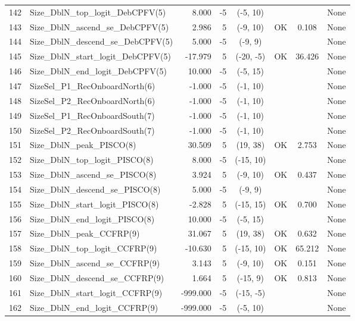 \documentclass[12pt,]{article}
\begin{document}
\begin{landscape}
\begin{longtable}{rlrrcccp{1.5in}}
  142 & Size\_DblN\_top\_logit\_DebCPFV(5) & 8.000 & -5 & (-5, 10) &  &  & None \\ 
  143 & Size\_DblN\_ascend\_se\_DebCPFV(5) & 2.986 & 5 & (-9, 10) & OK & 0.108 & None \\ 
  144 & Size\_DblN\_descend\_se\_DebCPFV(5) & 5.000 & -5 & (-9, 9) &  &  & None \\ 
  145 & Size\_DblN\_start\_logit\_DebCPFV(5) & -17.979 & 5 & (-20, -5) & OK & 36.426 & None \\ 
  146 & Size\_DblN\_end\_logit\_DebCPFV(5) & 10.000 & -5 & (-5, 15) &  &  & None \\ 
  147 & SizeSel\_P1\_RecOnboardNorth(6) & -1.000 & -5 & (-1, 10) &  &  & None \\ 
  148 & SizeSel\_P2\_RecOnboardNorth(6) & -1.000 & -5 & (-1, 10) &  &  & None \\ 
  149 & SizeSel\_P1\_RecOnboardSouth(7) & -1.000 & -5 & (-1, 10) &  &  & None \\ 
  150 & SizeSel\_P2\_RecOnboardSouth(7) & -1.000 & -5 & (-1, 10) &  &  & None \\ 
  151 & Size\_DblN\_peak\_PISCO(8) & 30.509 & 5 & (19, 38) & OK & 2.753 & None \\ 
  152 & Size\_DblN\_top\_logit\_PISCO(8) & 8.000 & -5 & (-15, 10) &  &  & None \\ 
  153 & Size\_DblN\_ascend\_se\_PISCO(8) & 3.924 & 5 & (-9, 10) & OK & 0.437 & None \\ 
  154 & Size\_DblN\_descend\_se\_PISCO(8) & 5.000 & -5 & (-9, 9) &  &  & None \\ 
  155 & Size\_DblN\_start\_logit\_PISCO(8) & -2.828 & 5 & (-15, 15) & OK & 0.700 & None \\ 
  156 & Size\_DblN\_end\_logit\_PISCO(8) & 10.000 & -5 & (-5, 15) &  &  & None \\ 
  157 & Size\_DblN\_peak\_CCFRP(9) & 31.067 & 5 & (19, 38) & OK & 0.632 & None \\ 
  158 & Size\_DblN\_top\_logit\_CCFRP(9) & -10.630 & 5 & (-15, 10) & OK & 65.212 & None \\ 
  159 & Size\_DblN\_ascend\_se\_CCFRP(9) & 3.143 & 5 & (-9, 10) & OK & 0.151 & None \\ 
  160 & Size\_DblN\_descend\_se\_CCFRP(9) & 1.664 & 5 & (-15, 9) & OK & 0.813 & None \\ 
  161 & Size\_DblN\_start\_logit\_CCFRP(9) & -999.000 & -5 & (-15, -5) &  &  & None \\ 
  162 & Size\_DblN\_end\_logit\_CCFRP(9) & -999.000 & -5 & (-5, 10) &  &  & None \\ 

\end{longtable}
\end{landscape}
\end{document}

